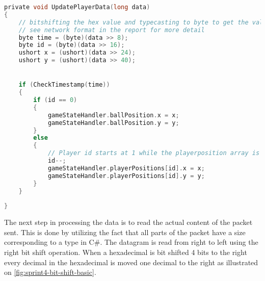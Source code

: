 \begin{lstlisting}[caption={Updating player data in UDP client}, captionpos=b,language=C,label={lst:updateplayerdata}]
private void UpdatePlayerData(long data)
{
    // bitshifting the hex value and typecasting to byte to get the values.
    // see network format in the report for more detail
    byte time = (byte)(data >> 8);
    byte id = (byte)(data >> 16);
    ushort x = (ushort)(data >> 24);
    ushort y = (ushort)(data >> 40);


    if (CheckTimestamp(time))
    {
        if (id == 0)
        {
            gameStateHandler.ballPosition.x = x;
            gameStateHandler.ballPosition.y = y;
        }
        else
        {
            // Player id starts at 1 while the playerposition array is 0 indexed. Decrementing id so that they line up.
            id--;
            gameStateHandler.playerPositions[id].x = x;
            gameStateHandler.playerPositions[id].y = y;
        }
    }
    
}
\end{lstlisting}
\noindent
The next step in processing the data is to read the actual content of the packet sent.
This is done by utilizing the fact that all parts of the packet have a size corresponding to a type in C\#.
The datagram is read from right to left using the right bit shift operation.
When a hexadecimal is bit shifted 4 bits to the right every decimal in the hexadecimal is moved one decimal to the right as illustrated on \autoref{fig:sprint4-bit-shift-basic}.


